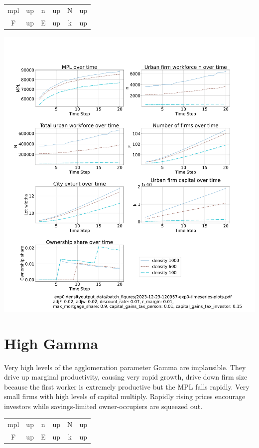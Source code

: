 \documentclass{article}
\begin{document}
\begin{tabular}{|c|c||c|c||c|c|}
mpl  & up & n   &  up & N   &  up \\
F    & up   & E   &  up  &  k & up
\end{tabular} 

 \hspace*{-2cm}\includegraphics[trim= 1.5cm 3.65cm 2cm 4.0cm, clip, scale=.3]{Density-3-20.pdf}

\newpage %

\section{High Gamma}
Very high levels of the agglomeration parameter Gamma are implausible. They drive up marginal productivity, causing very rapid growth, drive down firm size because the first worker is extremely productive but the MPL falls rapidly. Very small firms with high levels of capital multiply. Rapidly rising prices encourage investors while savings-limited owner-occupiers are squeezed out.
 
\begin{tabular}{|c|c||c|c||c|c|}
mpl  & up   & n   & up & N   &  up \\
F    & up   & E   &  up  &  k & up
\end{tabular} 
\end{document}
